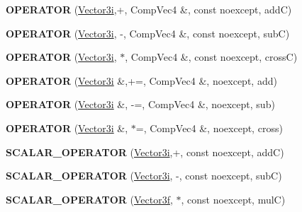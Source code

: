 \begin{DoxyCompactItemize}
\mbox{\label{class_vector3i_afd114222584f0261f54400bb78d72f1f}} 
{\bfseries O\+P\+E\+R\+A\+T\+OR} (\mbox{\hyperlink{class_vector3i}{Vector3i}},+, Comp\+Vec4 \&, const noexcept, addC)
\item 
\mbox{\label{class_vector3i_a64271757ab4f391f39211cf1ab9be3fe}} 
{\bfseries O\+P\+E\+R\+A\+T\+OR} (\mbox{\hyperlink{class_vector3i}{Vector3i}}, -\/, Comp\+Vec4 \&, const noexcept, subC)
\item 
\mbox{\label{class_vector3i_a4cc77172bd9109c0c47cc5a8e74f4dcf}} 
{\bfseries O\+P\+E\+R\+A\+T\+OR} (\mbox{\hyperlink{class_vector3i}{Vector3i}}, $\ast$, Comp\+Vec4 \&, const noexcept, crossC)
\item 
\mbox{\label{class_vector3i_ade9f743d5c9af8071e6e3618607ab07c}} 
{\bfseries O\+P\+E\+R\+A\+T\+OR} (\mbox{\hyperlink{class_vector3i}{Vector3i}} \&,+=, Comp\+Vec4 \&, noexcept, add)
\item 
\mbox{\label{class_vector3i_ad4b0c86f927671e34a9d405141a11609}} 
{\bfseries O\+P\+E\+R\+A\+T\+OR} (\mbox{\hyperlink{class_vector3i}{Vector3i}} \&, -\/=, Comp\+Vec4 \&, noexcept, sub)
\item 
\mbox{\label{class_vector3i_a455682cfe8fa7b5b60f00ddf9a83be6c}} 
{\bfseries O\+P\+E\+R\+A\+T\+OR} (\mbox{\hyperlink{class_vector3i}{Vector3i}} \&, $\ast$=, Comp\+Vec4 \&, noexcept, cross)
\item 
\mbox{\label{class_vector3i_a5e52dfbee5b609bcbbe2d985d9dc24d7}} 
{\bfseries S\+C\+A\+L\+A\+R\+\_\+\+O\+P\+E\+R\+A\+T\+OR} (\mbox{\hyperlink{class_vector3i}{Vector3i}},+, const noexcept, addC)
\item 
\mbox{\label{class_vector3i_a6aebcb83204598720d1e987fe261495d}} 
{\bfseries S\+C\+A\+L\+A\+R\+\_\+\+O\+P\+E\+R\+A\+T\+OR} (\mbox{\hyperlink{class_vector3i}{Vector3i}}, -\/, const noexcept, subC)
\item 
\mbox{\label{class_vector3i_ae81fc6de4f1e33eb232dc2ba05c1df66}} 
{\bfseries S\+C\+A\+L\+A\+R\+\_\+\+O\+P\+E\+R\+A\+T\+OR} (\mbox{\hyperlink{class_vector3f}{Vector3f}}, $\ast$, const noexcept, mulC)

\end{DoxyCompactItemize}
